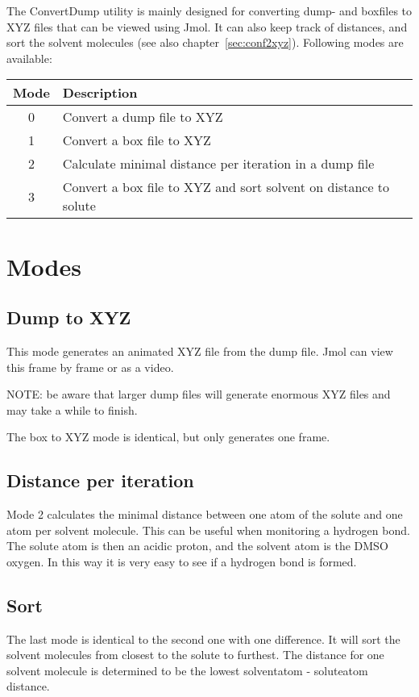 
The ConvertDump utility is mainly designed for converting dump- and boxfiles to 
XYZ files that can be viewed using Jmol. It can also keep track of distances, 
and sort the solvent molecules (see also chapter~\ref{sec:conf2xyz}). Following 
modes are available:

\begin{tabular}{cl}
	Mode & Description \\ \hline
	0 & Convert a dump file to XYZ \\
	1 & Convert a box file to XYZ \\
	2 & Calculate minimal distance per iteration in a dump file \\
	3 & Convert a box file to XYZ and sort solvent on distance to solute
\end{tabular}

\section{Modes}
\subsection{Dump to XYZ}
This mode generates an animated XYZ file from the dump file. Jmol can view this 
frame by frame or as a video.

NOTE: be aware that larger dump files will generate enormous XYZ files and may 
take a while to finish.

The box to XYZ mode is identical, but only generates one frame.

\subsection{Distance per iteration}
Mode 2 calculates the minimal distance between one atom of the solute and one 
atom per solvent molecule. This can be useful when monitoring a hydrogen bond. 
The solute atom is then an acidic proton, and the solvent atom is the DMSO 
oxygen. In this way it is very easy to see if a hydrogen bond is formed.

\subsection{Sort}
The last mode is identical to the second one with one difference. It will sort 
the solvent molecules from closest to the solute to furthest. The distance for 
one solvent molecule is determined to be the lowest solventatom - soluteatom 
distance.

